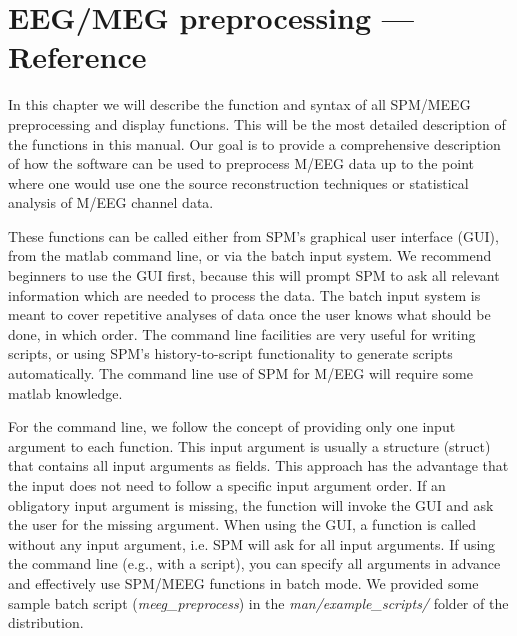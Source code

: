 \chapter{EEG/MEG preprocessing --- Reference
  \label{Chap:eeg:preprocessing}} 

In this chapter we will describe the function and syntax of all 
SPM/MEEG preprocessing and display functions. This will be the most
detailed description of the functions  in this
manual. Our goal is to provide a comprehensive description of how the
software can be used to preprocess M/EEG data up to the point where
one would use one the source reconstruction techniques or statistical
analysis of M/EEG channel data.

These functions can be called either from SPM's graphical user
interface (GUI), from the matlab command line, or via the batch input
system. We recommend beginners to use the GUI first, because this will
prompt SPM to ask all relevant information which are needed to process
the data. The batch input system is meant to cover repetitive analyses
of data once the user knows what should be done, in which order. The
command line facilities are very useful for writing scripts, or using
SPM's history-to-script functionality to generate scripts
automatically. The command line use of SPM for M/EEG will require some
matlab knowledge.

For the command line, we follow the concept of providing only one
input argument to each function. This input argument is usually a 
structure (struct) that contains all input arguments as fields. This
approach has the advantage that the input does not need to follow a
specific input argument order. If an obligatory input argument is
missing, the function will invoke the GUI and ask the user for the
missing argument. When using the GUI, a function is called without any
input argument, i.e. SPM will ask for all input arguments. If using
the command line (e.g., with a script), you can specify all arguments
in advance and effectively use SPM/MEEG functions in batch mode. We
provided some sample batch script (\textit{meeg\_preprocess}) in the
\textit{man/example\_scripts/} folder of the distribution.

